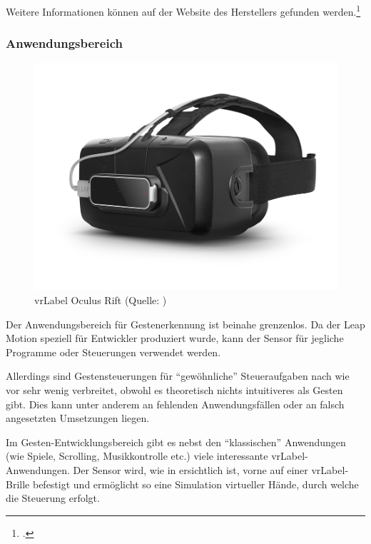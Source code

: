 Weitere Informationen können auf der Website des Herstellers gefunden werden.\footcite{Leap_Motion_Motion_Controller_2015-03-27}

\subsubsection{Anwendungsbereich}
\begin{figure}
	\includegraphics[width=1.0\linewidth]{images/analysis/leap_vr.png}
	\caption[Oculus Rift VR]{\acrshort{vrLabel} Oculus Rift (Quelle: )}
	\label{fig:leap_vr}
\end{figure}

Der Anwendungsbereich für Gestenerkennung ist beinahe grenzenlos.
Da der Leap Motion speziell für Entwickler produziert wurde, kann der Sensor für jegliche Programme oder Steuerungen verwendet werden.

Allerdings sind Gestensteuerungen für "`gewöhnliche"' Steueraufgaben nach wie vor sehr wenig verbreitet, obwohl es theoretisch nichts intuitiveres als Gesten gibt.
Dies kann unter anderem an fehlenden Anwendungsfällen oder an falsch angesetzten Umsetzungen liegen.

Im Gesten-Entwicklungsbereich gibt es nebst den "`klassischen"' Anwendungen (wie Spiele, Scrolling, Musikkontrolle etc.) viele interessante  \acrlong{vrLabel}-Anwendungen. Der Sensor wird, wie in  ersichtlich ist, vorne auf einer \gls{vrLabel}-Brille befestigt und ermöglicht so eine Simulation virtueller Hände, durch welche die Steuerung erfolgt.

